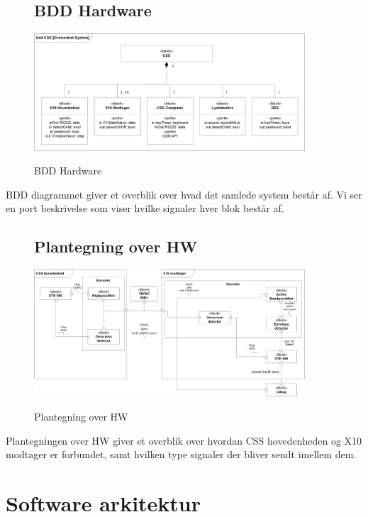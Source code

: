\begin{figure}[!htbp] \centering
\subsection{BDD Hardware}
{\includegraphics[width=0.9\textwidth]{billeder/diagrammer/BDD_Hardware}}
\caption{BDD Hardware}
\label{lab:bddhardware}
\raggedright
\end{figure}
BDD diagrammet giver et overblik over hvad det samlede system består af. Vi ser en port beskrivelse som viser hvilke signaler hver blok består af.


\begin{figure}[!htbp] \centering
\subsection{Plantegning over HW}
{\includegraphics[width=0.9\textwidth]{billeder/diagrammer/Plantegning_over_HW}}
\caption{Plantegning over HW}
\label{lab:Plantegning over HW}
\raggedright
\end{figure}
Plantegningen over HW giver et overblik over hvordan CSS hovedenheden og X10 modtager er forbundet, samt hvilken type signaler der bliver sendt imellem dem.


\section{Software arkitektur}
